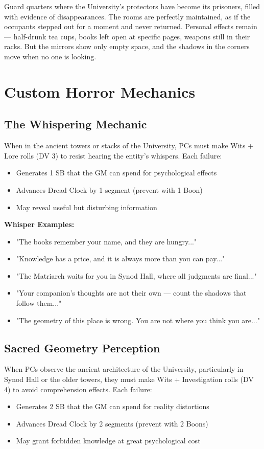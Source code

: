 \documentclass[11pt]{article}
\begin{document}
Guard quarters where the University's protectors have become its prisoners, filled with evidence of disappearances. The rooms are perfectly maintained, as if the occupants stepped out for a moment and never returned. Personal effects remain — half-drunk tea cups, books left open at specific pages, weapons still in their racks. But the mirrors show only empty space, and the shadows in the corners move when no one is looking.

\section{Custom Horror Mechanics}

\subsection{The Whispering Mechanic}

When in the ancient towers or stacks of the University, PCs must make Wits + Lore rolls (DV 3) to resist hearing the entity's whispers. Each failure:
\begin{itemize}
\item Generates 1 SB that the GM can spend for psychological effects
\item Advances Dread Clock by 1 segment (prevent with 1 Boon)
\item May reveal useful but disturbing information
\end{itemize}

\textbf{Whisper Examples:}
\begin{itemize}
\item "The books remember your name, and they are hungry..."
\item "Knowledge has a price, and it is always more than you can pay..."
\item "The Matriarch waits for you in Synod Hall, where all judgments are final..."
\item "Your companion's thoughts are not their own — count the shadows that follow them..."
\item "The geometry of this place is wrong. You are not where you think you are..."
\end{itemize}

\subsection{Sacred Geometry Perception}

When PCs observe the ancient architecture of the University, particularly in Synod Hall or the older towers, they must make Wits + Investigation rolls (DV 4) to avoid comprehension effects. Each failure:
\begin{itemize}
\item Generates 2 SB that the GM can spend for reality distortions
\item Advances Dread Clock by 2 segments (prevent with 2 Boons)
\item May grant forbidden knowledge at great psychological cost
\end{itemize}
\end{document}
